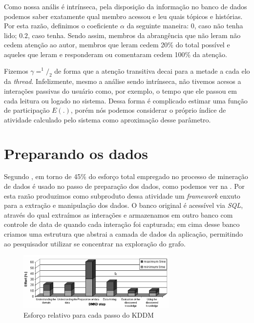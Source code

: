Como nossa anális é intrínseca, pela disposição da informação no banco de dados
podemos saber exatamente qual membro acessou e leu quais tópicos e histórias.
Por esta razão, definimos o coeficiente $\alpha$ da seguinte maneira: 0, caso
não tenha lido; $0.2$, caso tenha. Sendo assim, membros da abrangência que não
leram não cedem atenção ao autor, membros que leram cedem 20\% do total possível
e aqueles que leram e responderam ou comentaram cedem 100\% da atenção.

Fizemos $\gamma=^1/_2$ de forma que a atenção transitiva decai para a metade a
cada elo da \textit{thread}. Infelizmente, mesmo a análise sendo intrínseca, não
tivemos acesos a interações passivas do usuário como, por exemplo, o tempo que
ele passou em cada leitura ou logado no sistema. Dessa forma é complicado
estimar uma função de participação $E(.)$, porém nós podemos considerar o
próprio índice de atividade calculado pelo sistema como aproximação desse
parâmetro.

\section{Preparando os dados}
\label{ap:sec:preparacao}

Segundo \citet{Cios2005}, em torno de 45\% do esforço total empregado no
processo de mineração de dados é usado no passo de preparação dos dados, como
podemos ver na . Por esta razão produzimos como
subproduto dessa atividade um \emph{framework} enxuto para a extração e
manipulação dos dados. O banco original é acessível via \emph{SQL}, através do
qual extraímos as interações e armazenamos em outro banco com controle de data
de quando cada interação foi capturada; em cima desse banco criamos uma
estrutura que abstrai a camada de dados da aplicação, permitindo ao pesquisador
utilizar se concentrar na exploração do grafo.

\begin{figure}[h!]
  \centering
    \includegraphics[width=0.7\textwidth]{imgs/preparation-time.png}
  \caption{Esforço relativo para cada passo do KDDM \citep{Cios2005}}
    \label{ap:fig:esforco}
\end{figure}


